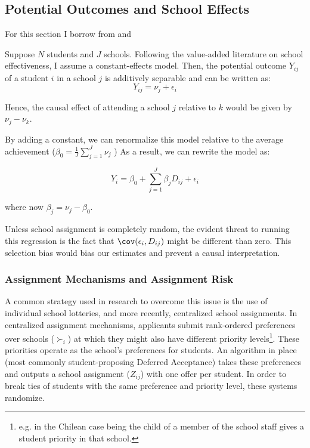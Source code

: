 \documentclass[a4paper, article, english, oneside, unknownkeysallowed, 12pt]{memoir}
\begin{document}
\subsection{Potential Outcomes and School Effects}

For this section I borrow from \textcite{angrist_credible_2024} and \textcite{abdulkadiroglu_research_2017}

Suppose $N$ students and $J$ schools. 
Following the value-added literature on school effectiveness,  I assume a constant-effects model. Then, the potential outcome $Y_{ij}$ of a student $i$ in a school $j$ is additively separable and can be written as: 
\begin{equation}
  Y_{ij} = \nu_j + \epsilon_i
  \label{linear-separable}
\end{equation}

Hence, the causal effect of attending a school $j$ relative to $k$ would be given by $\nu_j - \nu_k$.


By adding a constant, we can renormalize this model relative to the average achievement ($\beta_0 = \frac{1}{J}\sum_{j=1}^J \nu_j$ )
As a result, we can rewrite the model as: 

\begin{equation}
 Y_i = \beta_0 + \sum_{j=1}^J \beta_j D_{ij} + \epsilon_i 
  \label{base}
\end{equation}

where now $\beta_j = \nu_j - \beta_0$. 

Unless school assignment is completely random, the evident threat to running this regression is the fact that $\cov(\epsilon_i, D_{ij})$ might be different than zero. 
This selection bias would bias our estimates and prevent a causal interpretation.


\subsubsection{Assignment Mechanisms and Assignment Risk}
A common strategy used in research to overcome this issue is the use of individual school lotteries, and more recently, centralized school assignments. 
In centralized assignment mechanisms, applicants submit rank-ordered preferences over schools ($\succ_i$) at which they might also have different priority levels\footnote{e.g. in the Chilean case being the child of a member of the school staff gives a student priority in that school.}.
These priorities operate as the school's preferences for students. An algorithm in place (most commonly student-proposing Deferred Acceptance) takes these preferences and outputs a school assignment ($Z_{ij}$) with one offer per student.
In order to break ties of students with the same preference and priority level, these systems randomize. 
\end{document}
